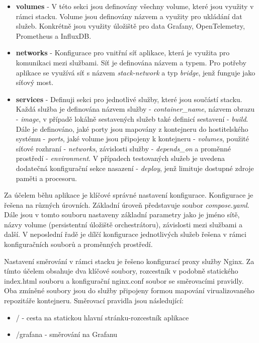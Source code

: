 \begin{itemize}
  \item \textbf{volumes} - V této sekci jsou definovány všechny volume, které jsou využity v rámci stacku. Volume jsou definovány názvem a využity pro ukládání dat služeb. Konkrétně jsou využity úložiště pro data Grafany, OpenTelemetry, Prometheus a InfluxDB.
  \item \textbf{networks} - Konfigurace pro vnitřní síť aplikace, která je využita pro komunikaci mezi službami. Síť je definována názvem a typem. Pro potřeby aplikace se využívá síť s názvem \emph{stack-network} a typ \emph{bridge}, jenž funguje jako síťový most.
  \item \textbf{services} - Definuji sekci pro jednotlivé služby, které jsou součástí stacku. Každá služba je definována názvem služby - \emph{container\_name}, názvem obrazu - \emph{image}, v případě lokálně sestavených služeb také definicí sestavení - \emph{build}. Dále je definováno, jaké porty jsou mapovány z kontejneru do hostitelského systému - \emph{ports}, jaké volume jsou připojeny k kontejneru - \emph{volumes}, použité síťové rozhraní - \emph{networks}, závislosti služby - \emph{depends\_on} a proměnné prostředí - \emph{environment}. V případech testovaných služeb je uvedena dodatečná konfigurační sekce nasazení - \emph{deploy}, jenž limituje dostupné zdroje paměti a procesoru.
\end{itemize}


Za účelem běhu aplikace je klíčové správné nastavení konfigurace. Konfigurace je řešena na různých úrovních. Základní úroveň představuje soubor \emph{compose.yaml}.  Dále jsou v tomto souboru nastaveny základní parametry jako je jméno sítě, názvy volume (persistentní úložiště orchestrátoru), závislosti mezi službami a další. V neposlední řadě je dílčí konfigurace jednotlivých služeb řešena v rámci konfiguračních souborů a proměnných prostředí. 

Nastavení směrování v rámci stacku je řešeno konfigurací proxy služby Nginx. Za tímto účelem obsahuje dva klíčové soubory, rozcestník v podobně statického index.html souboru a konfigurační nginx.conf soubor se směrovacími pravidly. Oba zmíněné soubory jsou do služby připojeny formou mapování virualizovaného repozitáře kontejneru. Směrovací pravidla jsou následující:

\begin{itemize}
    \item / - cesta na statickou hlavní stránku-rozcestník aplikace
    \item /grafana - směrování na Grafanu
\end{itemize}

